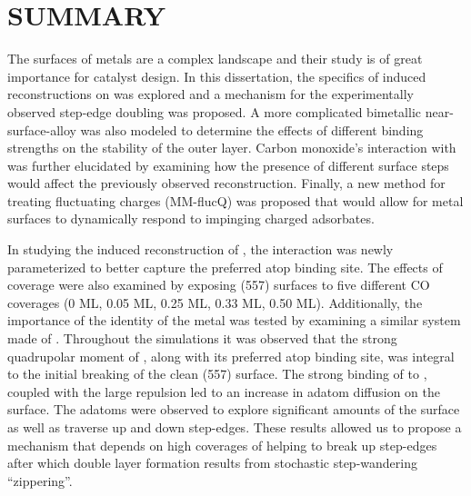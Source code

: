 \chapter{SUMMARY}
\label{chap:summary}

The surfaces of metals are a complex landscape and their study is of great
importance for catalyst design. In this dissertation, the specifics of 
induced reconstructions on  was explored and a mechanism for the
experimentally observed step-edge doubling was proposed. A more complicated
bimetallic  near-surface-alloy was also modeled to determine
the effects of different binding strengths on the stability of the outer
 layer.  Carbon monoxide's interaction with  was further
elucidated by examining how the presence of different surface steps would
affect the previously observed reconstruction. Finally, a new method for
treating fluctuating charges (MM-flucQ) was proposed that would allow for metal
surfaces to dynamically respond to impinging charged adsorbates.

In studying the induced reconstruction of , the 
interaction was newly parameterized to better capture the preferred atop
binding site. The effects of coverage were also examined by exposing (557)
 surfaces to five different CO coverages (0 ML, 0.05 ML, 0.25 ML, 0.33
ML, 0.50 ML).  Additionally, the importance of the identity of the metal was
tested by examining a similar system made of . Throughout the
simulations it was observed that the strong quadrupolar moment of ,
along with its preferred atop binding site, was integral to the initial
breaking of the clean (557) surface. The strong binding of  to ,
coupled with the large  repulsion led to an increase in
 adatom diffusion on the surface. The adatoms were observed to explore
significant amounts of the surface as well as traverse up and down step-edges.
These results allowed us to propose a mechanism that depends on high coverages
of  helping to break up step-edges after which double layer formation
results from stochastic step-wandering ``zippering''.

